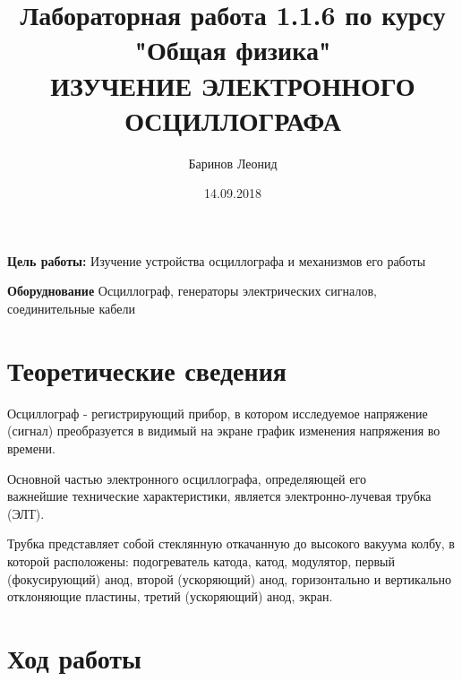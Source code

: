 \documentclass[a4paper,12pt]{article} %
\title{Лабораторная работа 1.1.6 по курсу \\ "Общая физика"  \\ 
\vspace{0.2cm}
\vspace{4.5cm}
 \LARGE{\textbf{ИЗУЧЕНИЕ ЭЛЕКТРОННОГО ОСЦИЛЛОГРАФА}}\vspace{5.5cm}}
\date{14.09.2018}
\author{\vspace{0.2cm}Баринов Леонид}
\begin{document}

\maketitle

\newpage


\textbf{Цель работы: } Изучение устройства осциллографа и механизмов его работы

\textbf{Оборуднование} Осциллограф, генераторы электрических сигналов, соединительные кабели


\section{Теоретические сведения}

Осциллограф - регистрирующий прибор, в котором исследуемое напряжение (сигнал) преобразуется в видимый на экране график изменения напряжения во времени.

Основной частью электронного осциллографа, определяющей его\\ важнейшие технические характеристики, является электронно-лучевая трубка (ЭЛТ).

Трубка представляет собой стеклянную откачанную до высокого вакуума колбу, в которой расположены: подогреватель катода, катод, модулятор, первый (фокусирующий) анод, второй (ускоряющий) анод, горизонтально и вертикально отклоняющие пластины, третий (ускоряющий) анод, экран.

\section{Ход работы}
\end{document}
